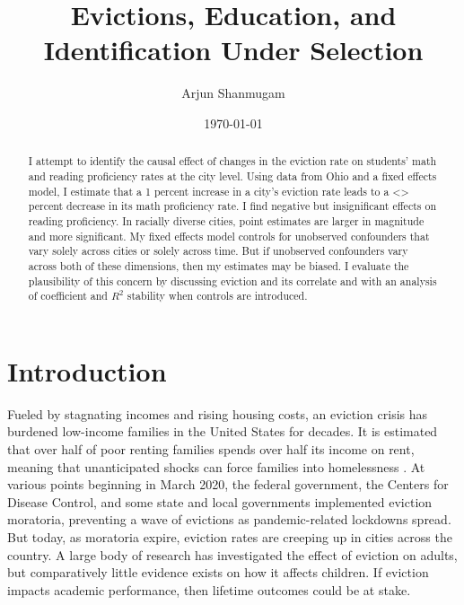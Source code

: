 \documentclass[12pt]{article}
\begin{document}
\begin{titlepage}
\title{Evictions, Education, and Identification Under Selection}
\author{Arjun Shanmugam}
\date{\today}
\maketitle
\begin{abstract}
\noindent I attempt to identify the causal effect of changes in the eviction rate on students' math and reading proficiency rates at the city level. Using data from Ohio and a fixed effects model, I estimate that a 1 percent increase in a city's eviction rate leads to a <> percent decrease in its math proficiency rate. I find negative but insignificant effects on reading proficiency. In racially diverse cities, point estimates are larger in magnitude and more significant. My fixed effects model controls for unobserved confounders that vary solely across cities or solely across time. But if unobserved confounders vary across both of these dimensions, then my estimates may be biased. I evaluate the plausibility of this concern by discussing eviction and its correlate and with an analysis of coefficient and $R^2$ stability when controls are introduced.\\

\bigskip
\end{abstract}
\setcounter{page}{0}
\thispagestyle{empty}
\end{titlepage}
\pagebreak \newpage




\doublespacing


\section{Introduction} \label{sec:introduction}
Fueled by stagnating incomes and rising housing costs, an eviction crisis has burdened low-income families in the United States for decades. It is estimated that over half of poor renting families spends over half its income on rent, meaning that unanticipated shocks can force families into homelessness \citep{desmond_evicted:_2017}. At various points beginning in March 2020, the federal government, the Centers for Disease Control, and some state and local governments implemented eviction moratoria, preventing a wave of evictions as pandemic-related lockdowns spread\citep{thrush_federal_2021, goldstein_landlords_2020}. But today, as moratoria expire, eviction rates are creeping up in cities across the country\citep{zaveri_after_2022}. A large body of research has investigated the effect of eviction on adults, but comparatively little evidence exists on how it affects children. If eviction impacts academic performance, then lifetime outcomes could be at stake.
\end{document}
